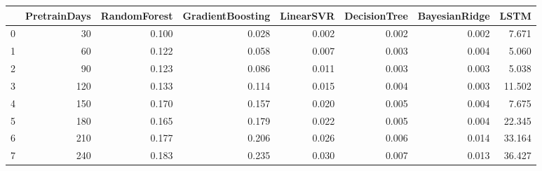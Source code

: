 \begin{tabular}{lrrrrrrr}
\toprule
{} &  PretrainDays &  RandomForest &  GradientBoosting &  LinearSVR &  DecisionTree &  BayesianRidge &   LSTM \\
\midrule
0 &            30 &         0.100 &             0.028 &      0.002 &         0.002 &          0.002 &  7.671 \\
1 &            60 &         0.122 &             0.058 &      0.007 &         0.003 &          0.004 &  5.060 \\
2 &            90 &         0.123 &             0.086 &      0.011 &         0.003 &          0.003 &  5.038 \\
3 &           120 &         0.133 &             0.114 &      0.015 &         0.004 &          0.003 & 11.502 \\
4 &           150 &         0.170 &             0.157 &      0.020 &         0.005 &          0.004 &  7.675 \\
5 &           180 &         0.165 &             0.179 &      0.022 &         0.005 &          0.004 & 22.345 \\
6 &           210 &         0.177 &             0.206 &      0.026 &         0.006 &          0.014 & 33.164 \\
7 &           240 &         0.183 &             0.235 &      0.030 &         0.007 &          0.013 & 36.427 \\
\bottomrule
\end{tabular}
